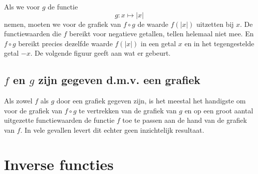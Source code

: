 Als we voor $g$ de functie
\[
g:x\mapsto |x|
\]
nemen, moeten we voor de grafiek van $f\circ g$ de waarde $f(|x|)$
uitzetten bij $x$. De functiewaarden die $f$ bereikt voor negatieve
getallen, tellen helemaal niet mee. En $f\circ g$ bereikt precies
dezelfde waarde $f(|x|)$ in een getal $x$ en in het tegengestelde
getal $-x$. De volgende figuur geeft aan wat er gebeurt. 

\begin{center}
\end{center}


\subsection{$f$ en $g$ zijn gegeven d.m.v. een grafiek}


Als zowel $f$ als $g$ door een grafiek gegeven zijn, is het meestal
het handigste om voor de grafiek van $f\circ g$ te vertrekken van de
grafiek van $g$ en op een groot aantal uitgezette functiewaarden de
functie $f$ toe te passen aan de hand van de grafiek van $f$. In vele
gevallen levert dit echter geen inzichtelijk resultaat.


\section{Inverse functies}
\label{secinv}

